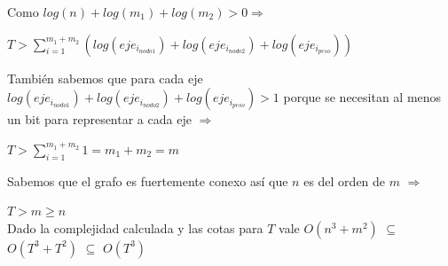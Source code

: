 \documentclass[11pt, a4paper, spanish]{article}
\begin{document}
	\noindent Como $log(n) + log(m_{1}) + log(m_{2}) > 0 \Rightarrow$
	\begin{center}
	$T > \displaystyle\sum_{i=1}^{m_{1} + m_{2}}{(log(eje_{i_{nodo1}})+log(eje_{i_{nodo2}}) + log(eje_{i_{peso}}))}$\\
	\end{center}

	\noindent Tambi\'en sabemos que para cada eje $log(eje_{i_{nodo1}})+log(eje_{i_{nodo2}}) + log(eje_{i_{peso}}) > 1$ porque se necesitan al menos un bit para representar a cada eje $\Rightarrow$\\
	\begin{center}
	$T > \displaystyle\sum_{i=1}^{m_{1} + m_{2}}{1} = m_{1} + m_{2} = m$ \\
	\end{center}
	Sabemos que el grafo es fuertemente conexo as\'i que $n$ es del orden de $m$ $\Rightarrow$

	\begin{center}
	$T > m \geq n$ \\
	Dado la complejidad calculada y las cotas para $T$ vale $O(n^{3} + m^{2})$ $\subseteq$ $O(T^{3}+T^{2})$ $\subseteq$ $O(T^{3})$
	\end{center}
\newpage
\end{document}
